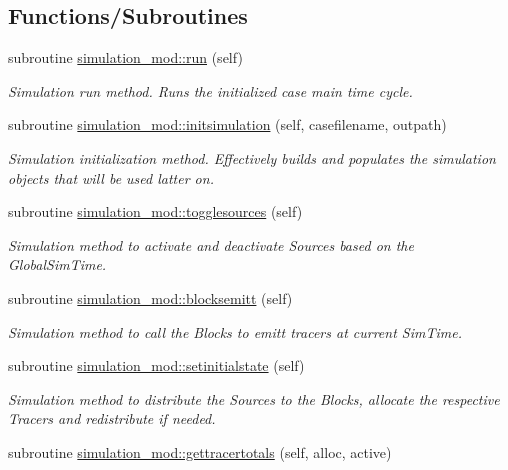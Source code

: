 \subsection*{Functions/\+Subroutines}
\begin{DoxyCompactItemize}
\item 
subroutine \mbox{\hyperlink{namespacesimulation__mod_a73bd78c4ac76c51f1e10f5847c25c4df}{simulation\+\_\+mod\+::run}} (self)
\begin{DoxyCompactList}\small\item\em Simulation run method. Runs the initialized case main time cycle. \end{DoxyCompactList}\item 
subroutine \mbox{\hyperlink{namespacesimulation__mod_aedbba2bb458cbcd7eb93938a5f7b5940}{simulation\+\_\+mod\+::initsimulation}} (self, casefilename, outpath)
\begin{DoxyCompactList}\small\item\em Simulation initialization method. Effectively builds and populates the simulation objects that will be used latter on. \end{DoxyCompactList}\item 
subroutine \mbox{\hyperlink{namespacesimulation__mod_a87a5141e4516b9610a6e4f0d2ff2d719}{simulation\+\_\+mod\+::togglesources}} (self)
\begin{DoxyCompactList}\small\item\em Simulation method to activate and deactivate Sources based on the GlobalSim\+Time. \end{DoxyCompactList}\item 
subroutine \mbox{\hyperlink{namespacesimulation__mod_a13aa0745f4601e3f418143dab2f18276}{simulation\+\_\+mod\+::blocksemitt}} (self)
\begin{DoxyCompactList}\small\item\em Simulation method to call the Blocks to emitt tracers at current Sim\+Time. \end{DoxyCompactList}\item 
subroutine \mbox{\hyperlink{namespacesimulation__mod_a447c6d709de6aa360a65d39d660e627b}{simulation\+\_\+mod\+::setinitialstate}} (self)
\begin{DoxyCompactList}\small\item\em Simulation method to distribute the Sources to the Blocks, allocate the respective Tracers and redistribute if needed. \end{DoxyCompactList}\item 
subroutine \mbox{\hyperlink{namespacesimulation__mod_ab40f39c4bf37da066101f93b67ad9b26}{simulation\+\_\+mod\+::gettracertotals}} (self, alloc, active)

\end{DoxyCompactItemize}
